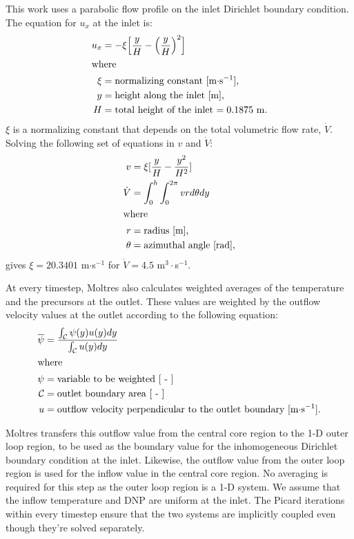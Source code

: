 This work uses a parabolic flow profile on the inlet Dirichlet boundary
condition. The equation for $u_x$ at the inlet is:
%
\begin{align}
    u_x &= -\xi \Big[\frac{y}{H} - \Big(\frac{y}{H}\Big)^2 
    \Big] \\
    \intertext{where}
    \xi &= \text{normalizing constant [m$\cdot$s$^{-1}$],} \nonumber \\
    y &= \text{height along the inlet [m],} \nonumber \\
    H &= \text{total height of the inlet $= 0.1875$ m.} \nonumber
\end{align}
%
$\xi$ is a normalizing constant that depends on the total volumetric flow
rate, $\dot{V}$. Solving the following set of equations in $v$ and $\dot{V}$:
%
\begin{align}
    v &= \xi [\frac{y}{H} - \frac{y^2}{H^2}] \\
    \dot{V} &= \int^h_0 \int^{2 \pi}_0 v r d\theta dy \\
    \intertext{where}
    r &= \text{radius [m],} \nonumber \\
    \theta &= \text{azimuthal angle [rad],} \nonumber
\end{align}
%
gives $\xi = 20.3401$ m$\cdot$s$^{-1}$ for $\dot{V} = 4.5$ m$^3\cdot$s$^{-1}$. 

At every timestep, Moltres also calculates weighted averages of the
temperature and the precursors at the outlet. These values are weighted by the
outflow velocity values at the outlet according to the following equation:
%
\begin{align}
    \overline{\psi} &= \frac{\int_\mathcal{C} \psi(y) u(y) dy}{
    \int_\mathcal{C} u(y) dy} \\
    \intertext{where}
    \psi &= \text{variable to be weighted [ - ]} \nonumber \\
    \mathcal{C} &= \text{outlet boundary area [ - ]} \nonumber \\
    u &= \text{outflow velocity perpendicular to the outlet boundary
    [m$\cdot$s$^{-1}$].} \nonumber
\end{align}

Moltres transfers this outflow value from the central core region to the 1-D
outer loop region, to be used as the boundary value for the inhomogeneous
Dirichlet boundary
condition at the inlet. Likewise, the outflow value from the outer
loop region is used for the inflow value in the central core region. No
averaging is required for this step as the outer loop region is a 1-D system.
We assume that the inflow temperature and \gls{DNP} are uniform at the inlet.
The Picard iterations within every timestep ensure that the two systems are
implicitly coupled even though they're solved separately.
